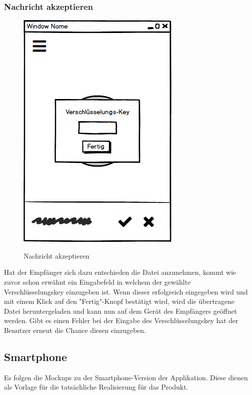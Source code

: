 \subsubsection{Nachricht akzeptieren}
\begin{figure}[H]
	\centering
	\includegraphics[width=.7\linewidth]{pictures/Desktop/Nachrichtaccept.png}\
	\caption{Nachricht akzeptieren}
\end{figure}
Hat der Empfänger sich dazu entschieden die Datei anzunehmen, kommt wie zuvor schon erwähnt ein Eingabefeld in welchem der gewählte Verschlüsselungskey einzugeben ist. Wenn dieser erfolgreich eingegeben wird und mit einem Klick auf den "Fertig"-Knopf bestätigt wird, wird die übertragene Datei heruntergeladen und kann nun auf dem Gerät des Empfängers geöffnet werden. Gibt es einen Fehler bei der Eingabe des Verschlüsselungskey hat der Benutzer erneut die Chance diesen einzugeben.

\subsection{Smartphone}
Es folgen die Mockups zu der Smartphone-Version der Applikation. Diese dienen als Vorlage für die tatsächliche Realisierung für das Produkt.
